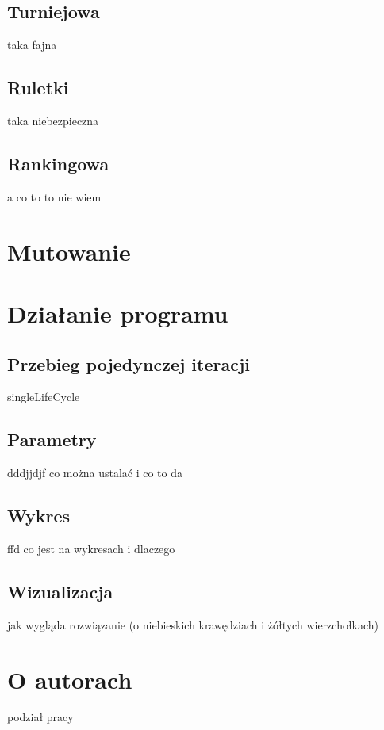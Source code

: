 \documentclass[11pt]{aghdpl}
\begin{document}
\section{Turniejowa}
\label{sec:tournament}
taka fajna
\section{Ruletki}
\label{sec:roulette}
taka niebezpieczna
\section{Rankingowa}
\label{sec:linear}
a co to to nie wiem

\chapter{Mutowanie}
\label{cha:mutation}

\chapter{Działanie programu}
\label{cha:program}
\section{Przebieg pojedynczej iteracji}
\label{sec:singleLifeCycle}
singleLifeCycle
\section{Parametry}
\label{sec:params}
dddjjdjf
co można ustalać i co to da
\section{Wykres}
\label{sec:chart}
ffd
co jest na wykresach i dlaczego
\section{Wizualizacja}
\label{sec:visualization}
jak wygląda rozwiązanie (o niebieskich krawędziach i żółtych wierzchołkach)

\chapter{O autorach} 
\label{cha:aboutAut}
podział pracy


%
%



% 
% 

%
%
%
%
%
%
\end{document}
